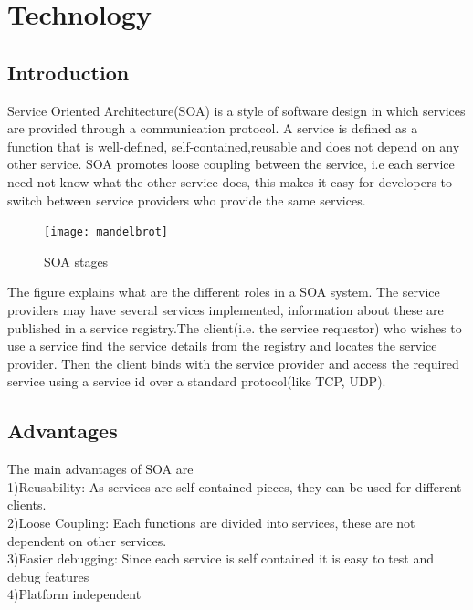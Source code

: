 \documentclass{fisattraining}
\begin{document}
\chapter{Technology}
\setcounter{page}{1}
\renewcommand{\baselinestretch}{1.50}
\section{Introduction}
Service Oriented Architecture(SOA) is a style of software design in which  services are provided through a communication protocol. A service is defined as a function that is  well-defined, self-contained,reusable and does not depend on any other service. SOA promotes loose coupling between the service, i.e each service need not know what the other service does, this makes it easy for developers to switch between service providers who provide the same services.
\begin{figure}[h!]
\begin{center}
\texttt{[image: mandelbrot]}
\caption{SOA stages}
\end{center}
\end{figure}
The figure explains what are the different roles in a SOA system. The service providers may have several services implemented, information about these are  published in a service registry.The client(i.e. the service requestor) who wishes to use a service find the service details from the registry and locates the service provider. Then the client binds with the service provider and access the required service using a service id over a standard protocol(like TCP, UDP).
\section{Advantages}
The main advantages of SOA are\\
  1)Reusability: As services are self contained pieces, they can be used for different clients.\\
  2)Loose Coupling: Each functions are divided into services, these are not dependent on other services.\\
  3)Easier debugging: Since each service is self contained it is easy to test and debug features\\
  4)Platform independent
\end{document}
